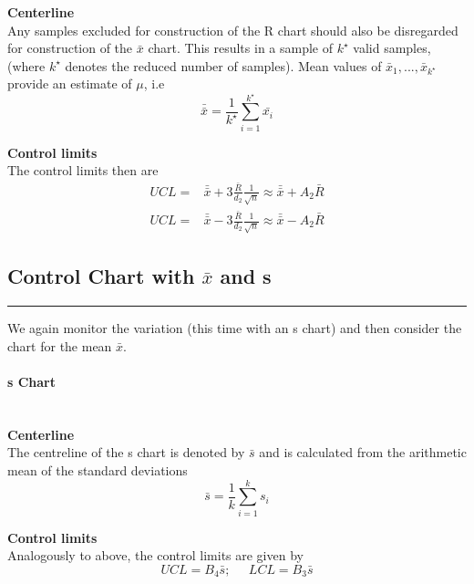 \textbf{Centerline}\\
Any samples excluded for construction of the R chart should also be disregarded for construction of the $\bar{x}$ chart.
This results in a sample of $k^\star$ valid samples, (where $k^\star$ denotes the reduced number of samples).
Mean values of $\bar{x}_1, ... ,\bar{x}_{k^\star}$ provide an estimate of $\mu$, i.e
\begin{equation}
  \bar{\bar{x}} = \frac{1}{k^\star} \sum^{k^\star}_{i=1} \bar{x_i}
\end{equation}

\textbf{Control limits}\\
The control limits then are
\begin{equation}
  \begin{split}
    UCL =& \bar{\bar{x}} + 3\frac{\bar{R}}{d_2} \frac{1}{\sqrt{n}}\approx \bar{\bar{x}} + A_2 \bar{R}\\
    UCL =& \bar{\bar{x}} - 3\frac{\bar{R}}{d_2} \frac{1}{\sqrt{n}}\approx \bar{\bar{x}} - A_2 \bar{R}
  \end{split}
\end{equation}

\subsection{Control Chart with $\bar{x}$ and s}
\noindent\rule[\linienAbstand]{\linewidth}{\linienDicke}
We again monitor the variation (this time with an s chart) and then consider the chart for the mean $\bar{x}$.
\paragraph{s Chart}\mbox{}\\
\textbf{Centerline}\\
The centreline of the s chart is denoted by $\bar{s}$ and is calculated from the arithmetic mean of the standard deviations\\
\begin{equation}
  \bar{s} = \frac{1}{k} \sum^k_{i=1} s_i
\end{equation}

\textbf{Control limits}\\
Analogously to above, the control limits are given by
\begin{equation}
    UCL = B_4 \bar{s}; \;\;\;\;\; LCL = B_3 \bar{s}
\end{equation}


